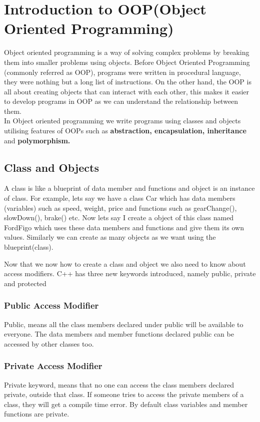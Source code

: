 \documentclass[11pt, a4paper]{article}
\begin{document}
\newpage
\section{Introduction to OOP(Object Oriented Programming)}
Object oriented programming is a way of solving complex problems by breaking
them into smaller problems using objects. Before Object Oriented Programming
(commonly referred as OOP), programs were written in procedural language,
they were nothing but a long list of instructions. On the other hand, the OOP
is all about creating objects that can interact with each other, this makes it
easier to develop programs in OOP as we can understand the relationship between them.\\
In Object oriented programming we write programs using classes and objects utilising
features of OOPs such as \textbf{abstraction, encapsulation, inheritance} and
\textbf{polymorphism.}

\subsection{Class and Objects}
A class is like a blueprint of data member and functions and object is an instance
of class. For example, lets say we have a class Car which has data members (variables)
such as speed, weight, price and functions such as gearChange(), slowDown(), brake() etc.
Now lets say I create a object of this class named FordFigo which uses these data members
and functions and give them its own values. Similarly we can create as many objects as we
want using the blueprint(class).

Now that we now how to create a class and object we also need to know about access modifiers.
C++ has three new keywords introduced, namely public, private and protected

\subsubsection{Public Access Modifier}
Public, means all the class members declared under public will be available to everyone.
The data members and member functions declared public can be accessed by other classes too.


\subsubsection{Private Access Modifier}
Private keyword, means that no one can access the class members declared private,
outside that class. If someone tries to access the private members of a class, they
will get a compile time error. By default class variables and member functions are private.

\end{document}
